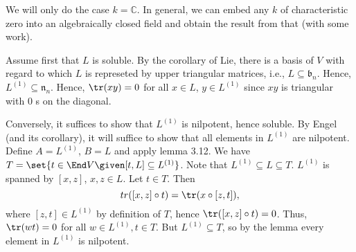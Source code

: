 We will only do the case $k = \mathbb{C}$. In general, we can embed any $k$ of
characteristic zero into an algebraically closed field and obtain the result from
that (with some work).

Assume first that $L$ is soluble. By the corollary of Lie, there is a basis of
$V$ with regard to which $L$ is represeted by upper triangular matrices, i.e.,
$L \subseteq \mathfrak{b}_n$. Hence, $L^{(1)} \subseteq \mathfrak{n}_n$. Hence,
$\tr(xy) = 0$ for all $x \in L$, $y \in L^{(1)}$ since $xy$ is triangular with
$0$ s on the diagonal.

Conversely, it suffices to show that $L^{(1)}$ is nilpotent, hence soluble.
By Engel (and its corollary), it will suffice to show that all elements in
$L^{(1)}$ are nilpotent. Define $A = L^{(1)}$, $B = L$ and apply lemma 3.12.
We have $T = \set{t \in \End V\given [t, L] \subseteq L^{(1)}}$. Note
that $L^{(1)} \subseteq L \subseteq T$.
$L^{(1)}$ is spanned by $[x, z]$,  $x, z \in L$. Let $t \in T$. Then
\[ tr([x, z] \circ t) = \tr(x \circ [z, t]),\]
where $[z, t] \in L^{(1)}$ by definition of $T$, hence $\tr([x, z] \circ t) = 0$.
Thus, $\tr(wt) = 0$ for all $w \in L^{(1)}, t \in T$. But $L^{(1)} \subseteq T$,
so by the lemma every element in $L^{(1)}$ is nilpotent.
